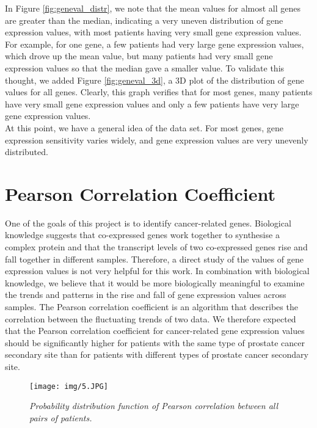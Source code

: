 \documentclass[12pt,a4paper]{report}
\begin{document}
In Figure \ref{fig:geneval_distr}, we note that the mean values for almost all genes are greater than the median, indicating a very uneven distribution of gene expression values, with most patients having very small gene expression values. For example, for one gene, a few patients had very large gene expression values, which drove up the mean value, but many patients had very small gene expression values so that the median gave a smaller value. To validate this thought, we added Figure \ref{fig:geneval_3d}, a 3D plot of the distribution of gene values for all genes. Clearly, this graph verifies that for most genes, many patients have very small gene expression values and only a few patients have very large gene expression values. \\

At this point, we have a general idea of the data set. For most genes, gene expression sensitivity varies widely, and gene expression values are very unevenly distributed.


\section{Pearson Correlation Coefficient}
One of the goals of this project is to identify cancer-related genes. Biological knowledge suggests that co-expressed genes work together to synthesise a complex protein and that the transcript levels of two co-expressed genes rise and fall together in different samples. Therefore, a direct study of the values of gene expression values is not very helpful for this work. In combination with biological knowledge, we believe that it would be more biologically meaningful to examine the trends and patterns in the rise and fall of gene expression values across samples. The Pearson correlation coefficient is an algorithm that describes the correlation between the fluctuating trends of two data. We therefore expected that the Pearson correlation coefficient for cancer-related gene expression values should be significantly higher for patients with the same type of prostate cancer secondary site than for patients with different types of prostate cancer secondary site. \\



\begin{figure}[h!]
\centering
\texttt{[image: img/5.JPG]}
\caption{\textit{Probability distribution function of Pearson correlation between all pairs of patients. } }
\label{fig:corrpdf}
\end{figure}\\
\end{document}
